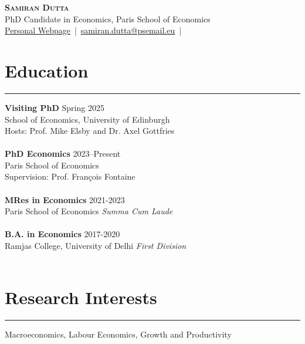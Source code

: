 \documentclass[11pt,a4paper]{article}
\begin{document}
\begin{center}
    {\LARGE\bfseries \textsc{Samiran Dutta}}
    \\[10pt]
    PhD Candidate in Economics, Paris School of Economics\\
    \href{https://sites.google.com/view/samirandutta/home}{Personal Webpage} \,|\,
    \href{mailto:samiran.dutta@psemail.eu}{samiran.dutta@psemail.eu} \,|\, 
    \href{https://github.com/samirandutta}{\faGithub}    
    \href{https://scholar.google.com/citations?user=Nul09cIAAAAJ&hl=en&oi=ao}{\aiGoogleScholar}
    \\
\end{center}

\section*{Education}
\vspace{-0.5em}
\hrule
\vspace{0.5em}
\textbf{Visiting PhD}
\hfill
Spring 2025\\ 
School of Economics, University of Edinburgh\\
Hosts: Prof. Mike Elsby and Dr. Axel Gottfries\\
\vspace{-0.1em}\\
\textbf{PhD Economics}
\hfill
2023--Present\\ 
Paris School of Economics\\
Supervision: Prof. François Fontaine\\
\vspace{-0.1em}\\
\textbf{MRes in Economics}
\hfill
2021-2023\\ 
Paris School of Economics
\hfill
\textit{Summa Cum Laude}\\
\vspace{-0.1em}\\
\textbf{B.A. in Economics}
\hfill
2017-2020\\ 
Ramjas College, University of Delhi
\hfill
\textit{First Division}
\\

\vspace{-0.5cm}\\

\section*{Research Interests}
\vspace{-0.5em}
\hrule
\vspace{0.5em}
Macroeconomics, Labour Economics, Growth and Productivity
\end{document}
